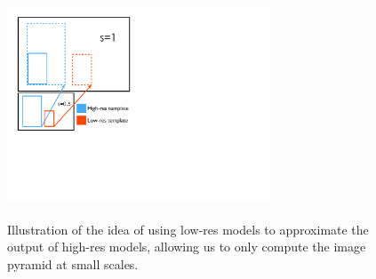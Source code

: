 \begin{figure}[h!]
  \caption{Illustration of the idea of using low-res models to approximate the output of high-res models, allowing us to only compute the image pyramid at small scales.}
  \centering
    \includegraphics[width=0.7\textwidth]{../figures/multiscale.pdf}
  \label{fig:multiscale}
\end{figure}